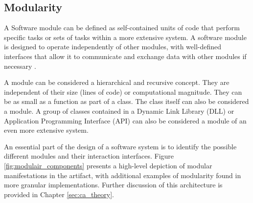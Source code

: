 \subsection{Modularity}

A Software module can be defined as self-contained units of code that perform specific
tasks or sets of tasks within a more extensive system. A software module is designed to operate
independently of other modules, with well-defined interfaces that allow it to communicate
and exchange data with other modules if necessary \autocite[22]{mannaert_normalized_2016}.

A module can be considered a hierarchical and recursive concept. They are independent of
their size (lines of code) or computational magnitude. They can be as small as a function
as part of a class. The class itself can also be considered a module. A group of classes
contained in a Dynamic Link Library (DLL) or Application Programming Interface (API) can
also be considered a module of an even more extensive system. 

An essential part of the design of a software system is to identify the possible different
modules and their interaction interfaces. Figure \ref{fig:modulair_components} presents a
high-level depiction of modular manifestations in the artifact, with additional examples
of modularity found in more granular implementations. Further discussion of this
architecture is provided in Chapter \ref{sec:ca_theory}.